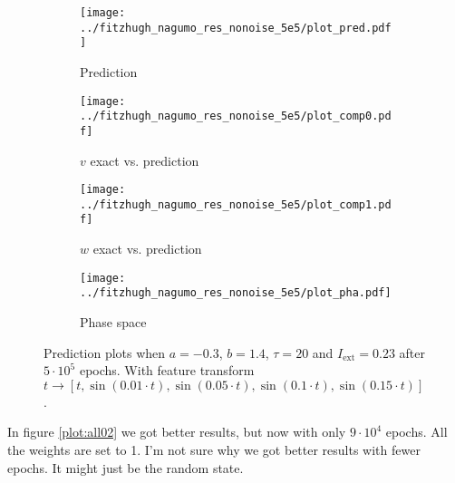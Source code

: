 \documentclass[a4paper]{article}
\begin{document}
\begin{figure}[H]
	\centering 
	\begin{subfigure}[b]{0.47\textwidth}
		\centering
		\texttt{[image: ../fitzhugh\_nagumo\_res\_nonoise\_5e5/plot\_pred.pdf]}
		\caption{Prediction}
		\label{fig:all01a}
	\end{subfigure}
	\begin{subfigure}[b]{0.47\textwidth}
		\centering
		\texttt{[image: ../fitzhugh\_nagumo\_res\_nonoise\_5e5/plot\_comp0.pdf]}
		\caption{$v$ exact vs. prediction}
		\label{fig:all01b}
	\end{subfigure}
	\begin{subfigure}[b]{0.47\textwidth}
		\centering
		\texttt{[image: ../fitzhugh\_nagumo\_res\_nonoise\_5e5/plot\_comp1.pdf]}
		\caption{$w$ exact vs. prediction}
		\label{fig:all01c}
	\end{subfigure}
	\begin{subfigure}[b]{0.47\textwidth}
		\centering
		\texttt{[image: ../fitzhugh\_nagumo\_res\_nonoise\_5e5/plot\_pha.pdf]}
		\caption{Phase space}
		\label{fig:all01d}
	\end{subfigure}
	\caption{Prediction plots when $a=-0.3$, $b=1.4$, $\tau=20$ and $ I_{\text{ext}}=0.23$ after $5\cdot10^5$ epochs. With feature transform $t \rightarrow \left[ t, \sin(0.01 \cdot  t), \sin(0.05 \cdot  t), \sin(0.1 \cdot  t), \sin(0.15 \cdot  t)\right] $.}
	\label{plot:all01}
\end{figure} 	
	


In figure \ref{plot:all02} we got better results, but now with only $9\cdot10^4$ epochs. All the weights are set to 1. I'm not sure why we got better results with fewer epochs. It might just be the random state. 
\end{document}
